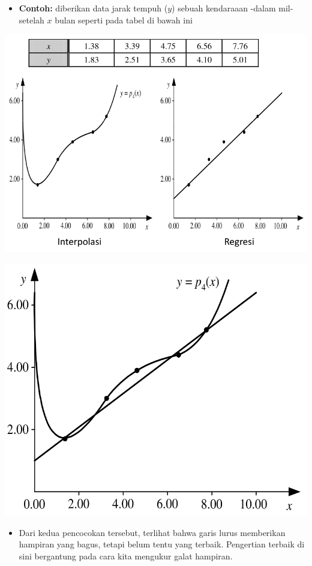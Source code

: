 \documentclass[pdflatex,compress,mathserif]{beamer}
\begin{document}
\begin{frame}
	\begin{itemize}
		\item \textbf{Contoh:} diberikan data jarak tempuh ($ y $) sebuah kendaraaan -dalam mil- setelah $ x $ bulan seperti pada tabel di bawah ini
	\end{itemize}
	\begin{center}
		\includegraphics[width=0.6\linewidth]{img/img01}
	\end{center}
\end{frame}

\begin{frame}
	\begin{center}
		\includegraphics[width=0.5\linewidth]{img/img02}
	\end{center}
	\begin{itemize}
		\item Dari kedua pencocokan tersebut, terlihat bahwa garis lurus memberikan
hampiran yang bagus, tetapi belum tentu yang terbaik. Pengertian terbaik
di sini bergantung pada cara kita mengukur galat hampiran.
	\end{itemize}
\end{frame}
\end{document}
